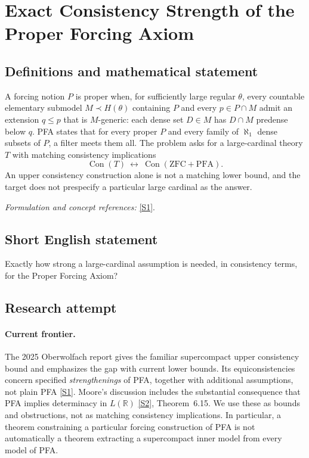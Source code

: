 \documentclass[11pt,a4paper]{article}
\newcommand{\R}{\mathbb{R}}
\newcommand{\sref}[2]{\hyperlink{source:#1:#2}{[S#2]}}
\newif\ifshowcatalogue
\newcommand{\cataloguescope}[1]{\ifshowcatalogue
 \paragraph{Exact scope in the supplied catalogue.}
 \begin{quote}\small #1\end{quote}\fi}
\numberwithin{equation}{section}
\begin{document}
\setcounter{section}{192}
\clearpage
\section{\texorpdfstring{Exact Consistency Strength of the Proper Forcing Axiom}{Exact Consistency Strength of the Proper Forcing Axiom}}\label{193}
\subsection{Definitions and mathematical statement}
A forcing notion $P$ is proper when, for sufficiently large regular $\theta$, every countable elementary submodel $M\prec H(\theta)$ containing $P$ and every $p\in P\cap M$ admit an extension $q\le p$ that is $M$-generic: each dense set $D\in M$ has $D\cap M$ predense below $q$. PFA states that for every proper $P$ and every family of $\aleph_1$ dense subsets of $P$, a filter meets them all. The problem asks for a large-cardinal theory $T$ with matching consistency implications
\[
 \operatorname{Con}(T)\ \longleftrightarrow\ \operatorname{Con}(\mathrm{ZFC}+\mathrm{PFA}).
\]
An upper consistency construction alone is not a matching lower bound, and the target does not prespecify a particular large cardinal as the answer.
\par\smallskip\textit{Formulation and concept references:} \sref{193}{1}.
\cataloguescope{Determine the exact large-cardinal consistency strength of ZFC plus the Proper Forcing Axiom (PFA): identify its equiconsistency level by matching upper and lower consistency bounds.}
\subsection{Short English statement}
Exactly how strong a large-cardinal assumption is needed, in consistency terms, for the Proper Forcing Axiom?
\subsection{Research attempt}

\paragraph{Current frontier.}
The 2025 Oberwolfach report gives the familiar supercompact upper consistency bound and emphasizes the gap with current lower bounds. Its equiconsistencies concern specified \emph{strengthenings} of PFA, together with additional assumptions, not plain PFA \sref{193}{1}. Moore's discussion includes the substantial consequence that PFA implies determinacy in $L(\R)$ \sref{193}{2}, Theorem~6.15. We use these as bounds and obstructions, not as matching consistency implications. In particular, a theorem constraining a particular forcing construction of PFA is not automatically a theorem extracting a supercompact inner model from every model of PFA.
\end{document}
